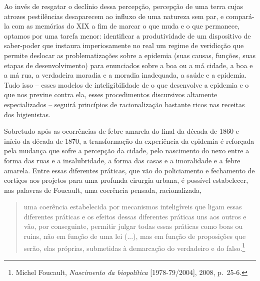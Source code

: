 Ao invés de resgatar o declínio dessa percepção, percepção de uma terra
cujas atrozes pestilências desaparecem ao influxo de uma natureza sem
par, e compará-la com as memórias do XIX a fim de marcar o que muda e o
que permanece, optamos por uma tarefa menor: identificar a produtividade
de um dispositivo de saber-poder que instaura imperiosamente no real um
regime de veridicção que permite deslocar as problematizações sobre a
epidemia (suas causas, funções, suas etapas de desenvolvimento) para
enunciados sobre a boa ou a má cidade, a boa e a má rua, a verdadeira
moradia e a moradia inadequada, a saúde e a epidemia. Tudo isso -- esses
modelos de inteligibilidade de o que desenvolve a epidemia e o que nos
previne contra ela, esses procedimentos discursivos altamente
especializados -- seguirá princípios de racionalização bastante ricos
nas receitas dos higienistas.

Sobretudo após as ocorrências de febre amarela do final da década de
1860 e início da década de 1870, a transformação da experiência da
epidemia é reforçada pela mudança que sofre a percepção da cidade, pelo
nascimento do nexo entre a forma das ruas e a insalubridade, a forma das
casas e a imoralidade e a febre amarela. Entre essas diferentes
práticas, que vão do policiamento e fechamento de cortiços aos projetos
para uma profunda cirurgia urbana, é possível estabelecer, nas palavras
de Foucault, uma coerência pensada, racionalizada,

\begin{quote}
uma coerência estabelecida por mecanismos inteligíveis que ligam essas
diferentes práticas e os efeitos dessas diferentes práticas uns aos
outros e vão, por conseguinte, permitir julgar todas essas práticas como
boas ou ruins, não em função de uma lei (...), mas em função de
proposições que serão, elas próprias, submetidas à demarcação do
verdadeiro e do falso.\footnote{Michel Foucault, \emph{Nascimento da
  biopolítica} {[}1978-79/2004{]}, 2008, p.~25-6.}
\end{quote}

